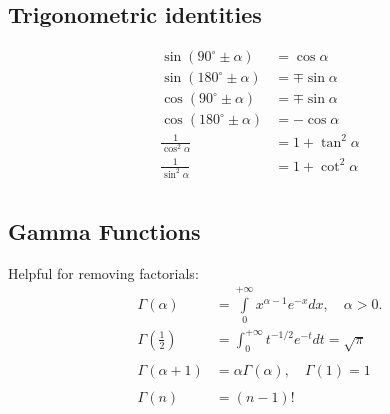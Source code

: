 \subsection{Trigonometric identities}
\begin{align*}
    \sin(90^\circ\pm\alpha)  & =\cos\alpha      \\
    \sin(180^\circ\pm\alpha) & =\mp\sin\alpha   \\
    \cos(90^\circ\pm\alpha)  & =\mp\sin\alpha   \\
    \cos(180^\circ\pm\alpha) & =-\cos\alpha     \\
    \frac{1}{\cos^2 \alpha}  & =1+\tan^2 \alpha \\
    \frac{1}{\sin^2 \alpha}  & =1+\cot^2 \alpha \\
\end{align*}

\subsection{Gamma Functions}
Helpful for removing factorials:
\begin{align*}
    \Gamma(\alpha)             & =\int\limits_{0}^{+\infty}x^{\alpha-1}e^{-x}dx,\quad\alpha>0. \\
    \Gamma\left(\frac12\right) & =\int_0^{+\infty}t^{-1/2}e^{-t}dt=\sqrt{\pi}                  \\ \\
    \Gamma(\alpha+1)           & =\alpha\Gamma(\alpha),\quad \Gamma(1)=1                       \\ \\
    \Gamma(n)                  & =(n-1)!
\end{align*}

